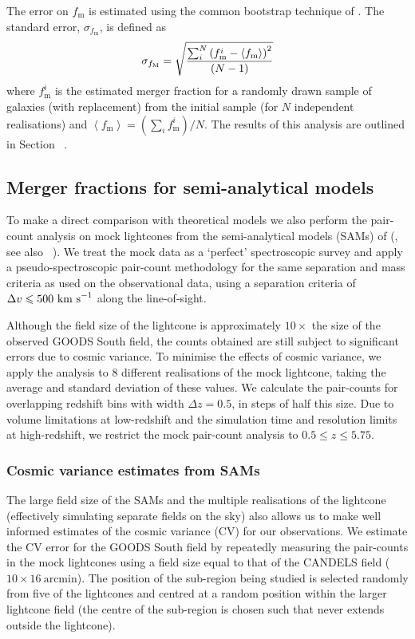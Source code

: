 The error on $f_\text{m}$ is estimated using the common bootstrap technique of \citet{Efron:1979uf,EFRON:HJ2mD4hg}. The standard error, $\sigma_{f_{\text{m}}}$, is defined as
\begin{equation}\label{eq:bootstrap_err}
	\sigma_{f_{\rm{M}}} = 
	\sqrt{\frac{\sum_{i}^{N} \left (f_{\text{m}}^{i} - \left \langle f_{\text{m}}  \right \rangle \right)^{2}}
	{(N-1)}
	} 
\end{equation}
where $f_{\text{m}}^{i}$ is the estimated merger fraction for a randomly drawn sample of galaxies (with replacement) from the initial sample (for $N$ independent realisations) and $\left \langle f_{\text{m}} \right \rangle =  \left( \sum_{i} f_{\text{m}}^{i} \right) / N $. The results of this analysis are outlined in Section~\label{sec:mergerfraction} .

\subsection{Merger fractions for semi-analytical models}
To make a direct comparison with theoretical models we also perform the pair-count analysis on mock lightcones from the semi-analytical models (SAMs) of \citeauthor{Lu:2011hj} (\citeyear{Lu:2011hj}, see also \citeauthor{Lu:2014kl}~\citeyear{Lu:2014kl}). We treat the mock data as a `perfect' spectroscopic survey and apply a pseudo-spectroscopic pair-count methodology for the same separation and mass criteria as used on the observational data, using a separation criteria of $\Delta v \leq 500~\rm{km~s}^{-1}$ along the line-of-sight.

Although the field size of the lightcone is approximately $10\times$ the size of the observed GOODS South field, the counts obtained are still subject to significant errors due to cosmic variance. To minimise the effects of cosmic variance, we apply the analysis to 8 different realisations of the mock lightcone, taking the average and standard deviation of these values. We calculate the pair-counts for overlapping redshift bins with width $\Delta z = 0.5$, in steps of half this size. Due to volume limitations at low-redshift and the simulation time and resolution limits at high-redshift, we restrict the mock pair-count analysis to $0.5 \leq z \leq 5.75$.

\subsubsection{Cosmic variance estimates from SAMs}\label{sec:CV_SAM}
The large field size of the SAMs and the multiple realisations of the lightcone (effectively simulating separate fields on the sky) also allows us to make well informed estimates of the cosmic variance (CV) for our observations. We estimate the CV error for the GOODS South field by repeatedly measuring the pair-counts in the mock lightcones using a field size equal to that of the CANDELS field ($10 \times 16 ~ \text{arcmin}$). The position of the sub-region being studied is selected randomly from five of the lightcones and centred at a random position within the larger lightcone field (the centre of the sub-region is chosen such that never extends outside the lightcone). 

